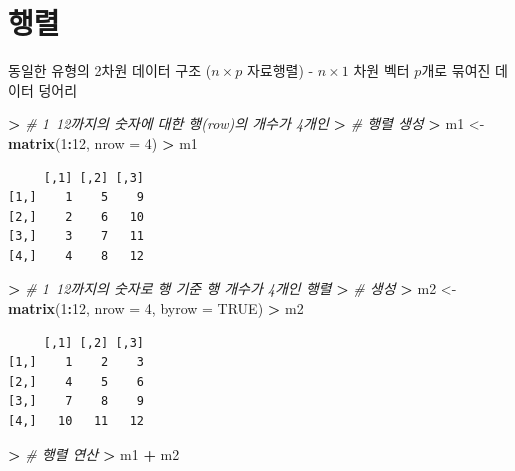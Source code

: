 \documentclass[12pt,a4paper]{book}
\newenvironment{Shaded}{\begin{snugshade}}{\end{snugshade}}
\newcommand{\KeywordTok}[1]{\textcolor[rgb]{0.13,0.29,0.53}{\textbf{#1}}}
\newcommand{\DataTypeTok}[1]{\textcolor[rgb]{0.13,0.29,0.53}{#1}}
\newcommand{\DecValTok}[1]{\textcolor[rgb]{0.00,0.00,0.81}{#1}}
\newcommand{\StringTok}[1]{\textcolor[rgb]{0.31,0.60,0.02}{#1}}
\newcommand{\CommentTok}[1]{\textcolor[rgb]{0.56,0.35,0.01}{\textit{#1}}}
\newcommand{\OtherTok}[1]{\textcolor[rgb]{0.56,0.35,0.01}{#1}}
\newcommand{\OperatorTok}[1]{\textcolor[rgb]{0.81,0.36,0.00}{\textbf{#1}}}
\newcommand{\ErrorTok}[1]{\textcolor[rgb]{0.64,0.00,0.00}{\textbf{#1}}}
\newcommand{\NormalTok}[1]{#1}
\theoremstyle{definition}
\theoremstyle{definition}
\theoremstyle{definition}
\theoremstyle{remark}
\begin{document}
\section{행렬}

동일한 유형의 2차원 데이터 구조 (\(n \times p\) 자료행렬) -
\(n \times 1\) 차원 벡터 \(p\)개로 묶여진 데이터 덩어리

\begin{Shaded}
\begin{Highlighting}[]
\OperatorTok{>}\StringTok{ }\CommentTok{# 1~12까지의 숫자에 대한 행(row)의 개수가 4개인}
\ErrorTok{>}\StringTok{ }\CommentTok{# 행렬 생성}
\ErrorTok{>}\StringTok{ }\NormalTok{m1 <-}\StringTok{ }\KeywordTok{matrix}\NormalTok{(}\DecValTok{1}\OperatorTok{:}\DecValTok{12}\NormalTok{, }\DataTypeTok{nrow =} \DecValTok{4}\NormalTok{)}
\OperatorTok{>}\StringTok{ }\NormalTok{m1}
\end{Highlighting}
\end{Shaded}

\begin{verbatim}
     [,1] [,2] [,3]
[1,]    1    5    9
[2,]    2    6   10
[3,]    3    7   11
[4,]    4    8   12
\end{verbatim}

\begin{Shaded}
\begin{Highlighting}[]
\OperatorTok{>}\StringTok{ }\CommentTok{# 1~12까지의 숫자로 행 기준 행 개수가 4개인 행렬}
\ErrorTok{>}\StringTok{ }\CommentTok{# 생성}
\ErrorTok{>}\StringTok{ }\NormalTok{m2 <-}\StringTok{ }\KeywordTok{matrix}\NormalTok{(}\DecValTok{1}\OperatorTok{:}\DecValTok{12}\NormalTok{, }\DataTypeTok{nrow =} \DecValTok{4}\NormalTok{, }\DataTypeTok{byrow =} \OtherTok{TRUE}\NormalTok{)}
\OperatorTok{>}\StringTok{ }\NormalTok{m2}
\end{Highlighting}
\end{Shaded}

\begin{verbatim}
     [,1] [,2] [,3]
[1,]    1    2    3
[2,]    4    5    6
[3,]    7    8    9
[4,]   10   11   12
\end{verbatim}

\begin{Shaded}
\begin{Highlighting}[]
\OperatorTok{>}\StringTok{ }\CommentTok{# 행렬 연산}
\ErrorTok{>}\StringTok{ }\NormalTok{m1 }\OperatorTok{+}\StringTok{ }\NormalTok{m2}
\end{Highlighting}
\end{Shaded}
\end{document}
